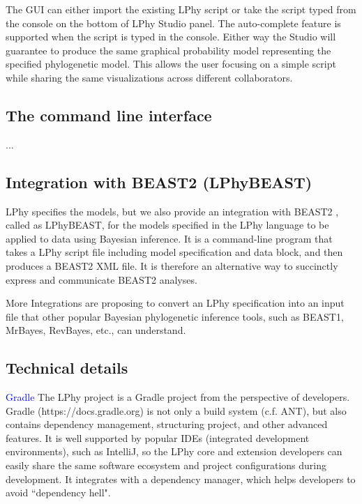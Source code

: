 \documentclass[10pt,letterpaper,table]{article}
\begin{document}
{The GUI can either import the existing LPhy script or take the script typed from the console on the bottom of LPhy Studio panel. 
The auto-complete feature is supported when the script is typed in the console.
Either way the Studio will guarantee to produce the same graphical probability model representing the specified phylogenetic model. 
This allows the user focusing on a simple script while sharing the same visualizations across different collaborators.  

\subsection{The command line interface} 
...

\subsection{Integration with BEAST2 (LPhyBEAST)}
\label{sec:lphybeast}
LPhy specifies the models, but we also provide an integration with BEAST2 \cite{bouckaert2014beastanalysis,bouckaert2019beastanalysis}, called as LPhyBEAST, for the models specified in the LPhy language to be applied to data using Bayesian inference.
It is a command-line program that takes a LPhy script file including model specification and data block, and then produces a BEAST2 XML file. 
It is therefore an alternative way to succinctly express and communicate BEAST2 analyses.

More Integrations are proposing to convert an LPhy specification into an input file that other popular Bayesian phylogenetic inference tools, such as BEAST1\cite{suchard2018bayesian}, MrBayes\cite{ronquist2012mrbayes}, RevBayes\cite{hohna2016revbayes}, etc., can understand.

\subsection{Technical details}
\textcolor{blue}{Gradle}
The LPhy project is a Gradle project from the perspective of developers. Gradle (https://docs.gradle.org) is not only a build system (c.f. ANT), but also contains dependency management, structuring project, and other advanced features. 
It is well supported by popular IDEs (integrated development environments), such as IntelliJ, so the LPhy core and extension developers can easily share the same software ecosystem and project configurations during development. 
It integrates with a dependency manager, which helps developers to avoid ``dependency hell". 

}
\end{document}
